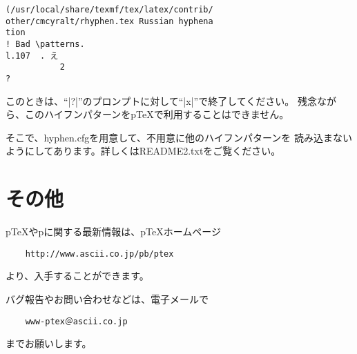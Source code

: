 \documentclass{plnews}
\begin{document}
\begin{verbatim}
(/usr/local/share/texmf/tex/latex/contrib/
other/cmcyralt/rhyphen.tex Russian hyphena
tion
! Bad \patterns.
l.107  . え
           2
?
\end{verbatim}

このときは、``|?|''のプロンプトに対して``|x|''で終了してください。
残念ながら、このハイフンパターンをp\TeX{}で利用することはできません。

そこで、hyphen.cfgを用意して、不用意に他のハイフンパターンを
読み込まないようにしてあります。詳しくはREADME2.txtをご覧ください。

\section{その他}
p\TeX{}やp\LaTeXe{}に関する最新情報は、p\TeX{}ホームページ
\begin{verbatim}
    http://www.ascii.co.jp/pb/ptex
\end{verbatim}
より、入手することができます。

バグ報告やお問い合わせなどは、電子メールで
\begin{verbatim}
    www-ptex＠ascii.co.jp
\end{verbatim}
までお願いします。
\end{document}
